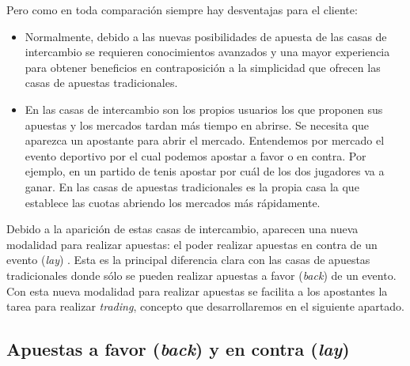 Pero como en toda comparación siempre hay desventajas para el cliente: 
\begin{itemize}
	\item Normalmente, debido a las nuevas posibilidades de apuesta de las casas de intercambio se requieren conocimientos avanzados y una mayor experiencia para obtener beneficios en contraposición a la simplicidad que ofrecen las casas de apuestas tradicionales.
	\item En las casas de intercambio son los propios usuarios los que proponen sus apuestas y los mercados tardan más tiempo en abrirse. Se necesita que aparezca un apostante para abrir el mercado. Entendemos por mercado el evento deportivo por el cual podemos apostar a favor o en contra. Por ejemplo, en un partido de tenis apostar por cuál de los dos jugadores va a ganar. En las casas de apuestas tradicionales es la propia casa la que establece las cuotas abriendo los mercados más rápidamente.
\end{itemize}

Debido a la aparición de estas casas de intercambio, aparecen una nueva modalidad para realizar apuestas: el poder realizar apuestas en contra de un evento (\emph{lay}) . Esta es la principal diferencia clara con las casas de apuestas tradicionales donde sólo se pueden realizar apuestas a favor (\emph{back}) de un evento.
 Con esta nueva modalidad para realizar apuestas se facilita a los apostantes la tarea para realizar \emph{trading}, concepto que desarrollaremos en el siguiente apartado.

 \subsection{Apuestas a favor (\emph{back}) y en contra (\emph{lay})}
 
